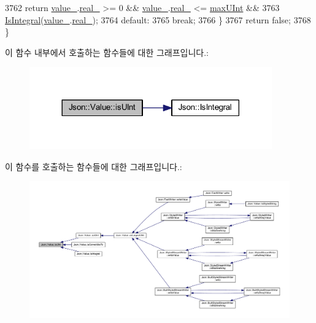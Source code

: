 \begin{DoxyCode}
3762     \textcolor{keywordflow}{return} \hyperlink{class_json_1_1_value_aef578244546212705b9f81eb84d7e151}{value\_}.\hyperlink{union_json_1_1_value_1_1_value_holder_af0c5ca724e5fe3a15db773d750e2351e}{real\_} >= 0 && \hyperlink{class_json_1_1_value_aef578244546212705b9f81eb84d7e151}{value\_}.\hyperlink{union_json_1_1_value_1_1_value_holder_af0c5ca724e5fe3a15db773d750e2351e}{real\_} <= \hyperlink{class_json_1_1_value_ac79e63ee68d3aa914bfd6988be669b87}{maxUInt} &&
3763            \hyperlink{namespace_json_a1a04cc9d31e64b5912dade003c9b99b5}{IsIntegral}(\hyperlink{class_json_1_1_value_aef578244546212705b9f81eb84d7e151}{value\_}.\hyperlink{union_json_1_1_value_1_1_value_holder_af0c5ca724e5fe3a15db773d750e2351e}{real\_});
3764   \textcolor{keywordflow}{default}:
3765     \textcolor{keywordflow}{break};
3766   \}
3767   \textcolor{keywordflow}{return} \textcolor{keyword}{false};
3768 \}
\end{DoxyCode}
이 함수 내부에서 호출하는 함수들에 대한 그래프입니다.\+:\nopagebreak
\begin{figure}[H]
\begin{center}
\leavevmode
\includegraphics[width=296pt]{class_json_1_1_value_abdda463d3269015f883587349726cfbc_cgraph}
\end{center}
\end{figure}
이 함수를 호출하는 함수들에 대한 그래프입니다.\+:\nopagebreak
\begin{figure}[H]
\begin{center}
\leavevmode
\includegraphics[width=350pt]{class_json_1_1_value_abdda463d3269015f883587349726cfbc_icgraph}
\end{center}
\end{figure}
\mbox{\label{class_json_1_1_value_a883576e35cb03a785258edb56777a2de}} 
